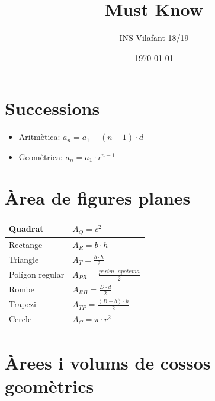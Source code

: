 \documentclass{article}
\title{Must Know}
\author{INS Vilafant 18/19}
\date{\today}
\begin{document}
\thispagestyle{empty}
\setlength{\unitlength}{1in}

\makeatletter
\par\noindent{\LARGE\bf \@title}
\vspace*{-1.2ex}
\par\noindent{{\rule{\textwidth}{1.05pt}}}
\par\noindent{\large \@author}
\section{Successions}
\begin{itemize}
	\item Aritmètica: $a_n=a_1 + (n-1)\cdot d$
	\item Geomètrica: $a_n=a_1 \cdot r^{n-1}$ 
\end{itemize}

\section{Àrea de figures planes}

\begin{tabular}{|l|l|}
\hline
Quadrat	& $A_{Q}=c^2$  \\
\hline
Rectange	& $A_{R}=b\cdot h$ \\
\hline
Triangle	& $A_{T}=\frac{b\cdot h}{2}$\\
\hline
Polígon regular	& $A_{PR}=\frac{perim\cdot apotema}{2}$\\
\hline
Rombe	& $A_{RB}=\frac{D\cdot d}{2}$\\
\hline
Trapezi	& $A_{TP}=\frac{(B+b)\cdot h}{2}$\\
\hline
Cercle	& $A_{C}=\pi \cdot r^2$\\
\hline
\end{tabular} 

\section{Àrees i volums de cossos geomètrics}
\end{document}
